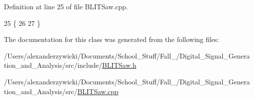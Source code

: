 Definition at line 25 of file B\+L\+I\+T\+Saw.\+cpp.


\begin{DoxyCode}
25                             \{
26     
27 \}\end{DoxyCode}


The documentation for this class was generated from the following files\+:\begin{DoxyCompactItemize}
\item 
/\+Users/alexanderzywicki/\+Documents/\+School\+\_\+\+Stuff/\+Fall\+\_/\+Digital\+\_\+\+Signal\+\_\+\+Generation\+\_\+and\+\_\+\+Analysis/src/include/\hyperlink{BLITSaw_8h}{B\+L\+I\+T\+Saw.\+h}\item 
/\+Users/alexanderzywicki/\+Documents/\+School\+\_\+\+Stuff/\+Fall\+\_/\+Digital\+\_\+\+Signal\+\_\+\+Generation\+\_\+and\+\_\+\+Analysis/src/\hyperlink{BLITSaw_8cpp}{B\+L\+I\+T\+Saw.\+cpp}\end{DoxyCompactItemize}
